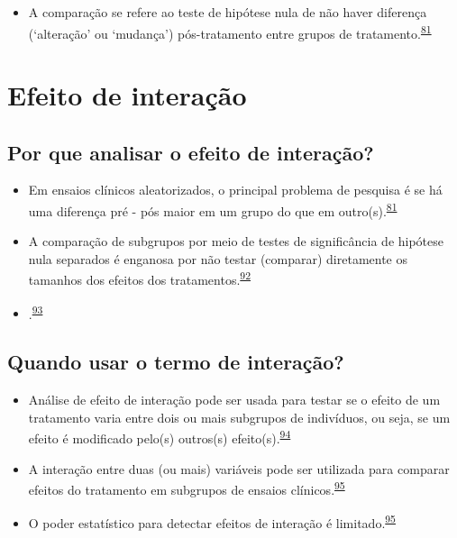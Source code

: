 \documentclass[
]{book}
\providecommand{\tightlist}{%
  \setlength{\itemsep}{0pt}\setlength{\parskip}{0pt}}
\begin{document}
\begin{itemize}
\tightlist
\item
  A comparação se refere ao teste de hipótese nula de não haver diferença (`alteração' ou `mudança') pós-tratamento entre grupos de tratamento.\textsuperscript{\protect\hyperlink{ref-bland2011}{81}}
\end{itemize}

\hypertarget{interacao}{%
\section{Efeito de interação}\label{interacao}}

\hypertarget{por-que-analisar-o-efeito-de-interauxe7uxe3o}{%
\subsection{Por que analisar o efeito de interação?}\label{por-que-analisar-o-efeito-de-interauxe7uxe3o}}

\begin{itemize}
\item
  Em ensaios clínicos aleatorizados, o principal problema de pesquisa é se há uma diferença pré - pós maior em um grupo do que em outro(s).\textsuperscript{\protect\hyperlink{ref-bland2011}{81}}
\item
  A comparação de subgrupos por meio de testes de significância de hipótese nula separados é enganosa por não testar (comparar) diretamente os tamanhos dos efeitos dos tratamentos.\textsuperscript{\protect\hyperlink{ref-Matthews1996}{92}}
\item
  .\textsuperscript{\protect\hyperlink{ref-Bours2023}{93}}
\end{itemize}

\hypertarget{quando-usar-o-termo-de-interauxe7uxe3o}{%
\subsection{Quando usar o termo de interação?}\label{quando-usar-o-termo-de-interauxe7uxe3o}}

\begin{itemize}
\item
  Análise de efeito de interação pode ser usada para testar se o efeito de um tratamento varia entre dois ou mais subgrupos de indivíduos, ou seja, se um efeito é modificado pelo(s) outros(s) efeito(s).\textsuperscript{\protect\hyperlink{ref-Altman1996}{94}}
\item
  A interação entre duas (ou mais) variáveis pode ser utilizada para comparar efeitos do tratamento em subgrupos de ensaios clínicos.\textsuperscript{\protect\hyperlink{ref-Altman2003}{95}}
\item
  O poder estatístico para detectar efeitos de interação é limitado.\textsuperscript{\protect\hyperlink{ref-Altman2003}{95}}
\end{itemize}
\end{document}

